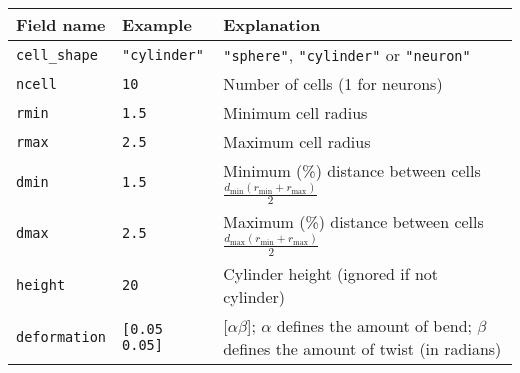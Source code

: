 \begin{tabular}{|l|l|p{8cm}|} \hline

    Field name              & Example                 & Explanation                                                                                                                                                                            \\ \hline

    \verb+cell_shape+  & \verb+"cylinder"+  & \verb+"sphere"+, \verb+"cylinder"+ or \verb+"neuron"+                                                                                                               \\ \hline
    \verb+ncell+  & \verb+10+  & Number of cells (1 for neurons)                                                                                                                                                        \\ \hline
    \verb+rmin+  & \verb+1.5+  & Minimum cell radius                                                                                                                                                                    \\ \hline
    \verb+rmax+ & \verb+2.5+ & Maximum cell radius                                                                                                                                                                    \\ \hline
    \verb+dmin+ & \verb+1.5+ & Minimum (\%) distance between cells $\frac{d_\text{min}(r_\text{min}+r_\text{max})}{2}$                                                                                                \\ \hline
    \verb+dmax+ & \verb+2.5+ & Maximum (\%) distance between cells $\frac{d_\text{max}(r_\text{min}+r_\text{max})}{2}$                                                                                                \\ \hline
    \verb+height+ & \verb+20+ & Cylinder height (ignored if not cylinder)                                                                                                                                              \\ \hline
    \verb+deformation+ & \verb+[0.05 0.05]+ & [$\alpha$\quad $\beta$]; \newline $\alpha$ defines the amount of bend; \newline $\beta$ defines the amount of twist (in radians)                                                       \\ \hline

\end{tabular}
